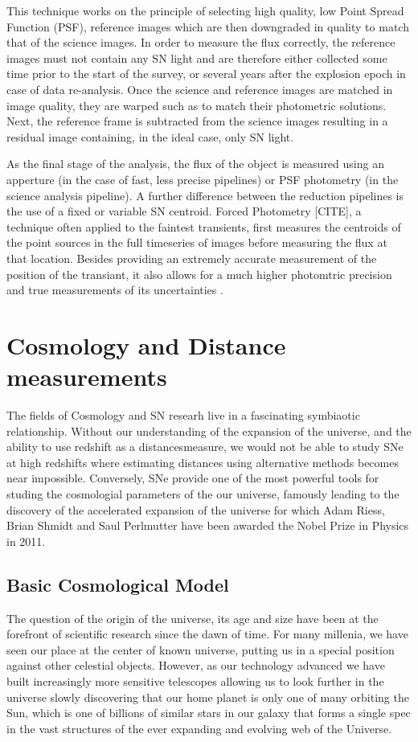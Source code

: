 This technique works on the principle of selecting high quality, low Point Spread Function (PSF), reference images which are then downgraded in quality to match that of the science images. In order to measure the flux correctly, the reference images must not contain any SN light and are therefore either collected some time prior to the start of the survey, or several years after the explosion epoch in case of data re-analysis. Once the science and reference images are matched in image quality, they are warped such as to match their photometric solutions. Next, the reference frame is subtracted from the science images resulting in a residual image containing, in the ideal case, only SN light.

As the final stage of the analysis, the flux of the object is measured using an apperture (in the case of fast, less precise pipelines) or PSF photometry (in the science analysis pipeline). A further difference between the reduction pipelines is the use of a fixed or variable SN centroid. Forced Photometry [CITE], a technique often applied to the faintest transients, first measures the centroids of the point sources in the full timeseries of images before measuring the flux at that location. Besides providing an extremely accurate measurement of the position of the transiant, it also allows for a much higher photomtric precision and true measurements of its uncertainties \citep{Firth2015}.

\section{Cosmology and Distance measurements}
The fields of Cosmology and SN researh live in a fascinating symbiaotic relationship. Without our understanding of the expansion of the universe, and the ability to use redshift as a distancesmeasure, we would not be able to study SNe at high redshifts where estimating distances using alternative methods becomes near impossible. Conversely, SNe provide one of the most powerful tools for studing the cosmologial parameters of the our universe, famously leading to the discovery of the accelerated expansion of the universe \citep{Riess1998,Perlmutter1997} for which Adam Riess, Brian Shmidt and Saul Perlmutter have been awarded the Nobel Prize in Physics in 2011.

\subsection{Basic Cosmological Model}
The question of the origin of the universe, its age and size have been at the forefront of scientific research since the dawn of time. For many millenia, we have seen our place at the center of known universe, putting us in a special position against other celestial objects. However, as our technology advanced we have built increasingly more sensitive telescopes allowing us to look further in the universe slowly discovering that our home planet is only one of many orbiting the Sun, which is one of billions of similar stars in our galaxy that forms a single spec in the vast structures of the ever expanding and evolving web of the Universe.

